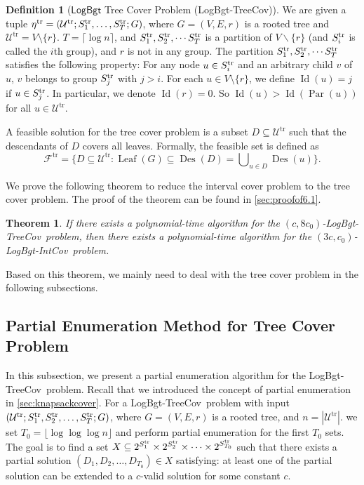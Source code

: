 \documentclass[11pt,a4paper]{article} \usepackage{enumitem}
\newcommand{\calF}{\mathcal{F}}
\newcommand{\calU}{\mathcal{U}}
\newcommand{\LBO}{\textsf{LogBgt}}
\newcommand{\LBOintcov}{\textsf{LogBgt-IntCov}}
\newcommand{\LBOtreecov}{\textsf{LogBgt-TreeCov}}
\newcommand{\trU}{\operatorname{\calU^{tr}}}
\newcommand{\trS}[1]{\ifx\relax#1\relax
    S^{\operatorname{tr}} \else
    S^{\operatorname{tr}}_{#1} \fi
}
\newcommand{\trF}{\operatorname{\calF^{tr}}}
\newcommand{\treta}{\operatorname{\eta^{tr}}}
\newcommand{\Des}{\operatorname{Des}}
\newcommand{\Leaf}{\operatorname{Leaf}}
\newcommand{\Lev}{\operatorname{Id}}
\newcommand{\Par}{\operatorname{Par}}
\newtheorem{theorem}{Theorem}[section]
\theoremstyle{definition}
\newtheorem{definition}{Definition}[section]
\begin{document}
\begin{definition}[$\LBO$ Tree Cover Problem (\LBOtreecov)]
We are given a tuple $\treta=(\trU;\trS{1},\ldots,\trS{T};G)$, where $G=(V,E,r)$ is a rooted tree and $\trU = V \setminus \{r\}$. $T=\lceil \log n\rceil$, and $\trS{1},\trS{2},\cdots \trS{T}$ is a partition of $V\backslash\{r\}$ (and $\trS{i}$ 
is called the $i$th group), and $r$ is not in any group. 
The partition $\trS{1},\trS{2},\cdots \trS{T}$ 
satisfies the following property:
For any node $u\in \trS{i}$ and an arbitrary child $v$ of $u$,
$v$ belongs to group $\trS{j}$ with $j>i$.
For each $u \in V \setminus \{r\}$, we define $\Lev(u) = j$ if $u \in \trS{j}$. In particular, we denote $\Lev(r) = 0$. So $\Lev(u) > \Lev(\Par(u))$ for all $u \in \trU$.

A feasible solution for the tree cover problem is 
a subset $D \subseteq \trU$ such that the descendants of $D$ covers all leaves. Formally, the feasible set is defined as
$$
\trF = \{D \subseteq \trU : \Leaf(G) \subseteq \Des(D)=\bigcup\nolimits_{u \in D} \Des(u)\}.
$$
\end{definition}

We prove the following theorem to reduce the interval cover problem to the tree cover problem. The proof of the theorem can be found in \cref{sec:proofof6.1}.

\begin{theorem}\label{thm:inter-to-tree}
If there exists a polynomial-time algorithm for the $(c, 8c_0)$-\LBOtreecov\ problem, then there exists a polynomial-time algorithm for the $(3c, c_0)$-\LBOintcov\ problem.
\end{theorem}



Based on this theorem, we mainly need to deal with the tree cover problem in the following subsections.


\subsection{Partial Enumeration Method for Tree Cover Problem}
\label{sec:Inter-Cover-2}

In this subsection, we present a partial enumeration algorithm for 
the \LBOtreecov\ problem.
Recall that we introduced the concept of partial enumeration in \cref{sec:knapsackcover}. For a \LBOtreecov\ problem with input $(\trU;\trS{1},\trS{2},\ldots,\trS{T};G)$, where $G=(V,E,r)$ is a rooted tree, and $n=|\trU|$. 
we set $T_0 = \lfloor \log \log \log n \rfloor$ and perform partial enumeration for the first $T_0$ sets. The goal is to find a set $X \subseteq 2^{\trS{1}} \times 2^{\trS{2}} \times \dots \times 2^{\trS{T_0}}$ such that there exists a partial solution $(D_1, D_2, \dots, D_{T_0}) \in X$ satisfying: at least one of 
the partial solution can be extended to a $c$-valid solution for some constant $c$.
\end{document}
